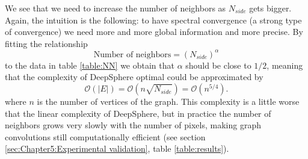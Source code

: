 We see that we need to increase the number of neighbors as $N_{side}$ gets bigger. Again, the intuition is the following: to have spectral convergence (a strong type of convergence) we need more and more global information and more precise. By fitting the relationship
$$
\text{Number of neighbors} = (N_{side})^\alpha
$$
to the data in table \ref{table:NN} we obtain that $\alpha$ should be close to $1/2$, meaning that the complexity of DeepSphere optimal could be approximated by
$$
\mathcal O(|E|) = \mathcal O(n\sqrt{N_{side}})  = \mathcal{O}(n^{5/4}).
$$
where $n$ is the number of vertices of the graph. This complexity is a little worse that the linear complexity of DeepSphere, but in practice the number of neighbors grows very slowly with the number of pixels, making graph convolutions still computationally efficient (see section \ref{sec:Chapter5:Experimental validation}, table \ref{table:results}). 


